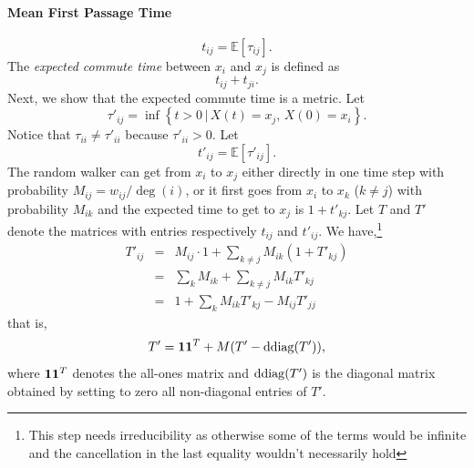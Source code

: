 \paragraph*{Mean First Passage Time}
\begin{equation}
t_{ij}=\mathbb{E}[\tau_{ij}].
\end{equation}
The {\em expected commute time} between ${x}_{i}$ and ${x}_{j}$
is defined as
\begin{equation}
t_{ij}+t_{ji}.
\end{equation}
Next, we show that the expected commute
time is a metric. Let
\begin{equation}
\tau'_{ij}=\inf\left\{ t>0 \,|\, X(t)={x}_{j},\,X(0)={x}_{i}\right\}.
\end{equation}
Notice that $\tau_{ii} \neq \tau'_{ii}$ because $\tau'_{ii} > 0.$ Let
\begin{equation}
t'_{ij}=\mathbb{E}[\tau'_{ij}].
\end{equation}
The random walker can get from $x_i$ to $x_j$ either directly in one time step with probability $M_{ij}=w_{ij}/\deg(i)$, or it first goes from $x_i$ to $x_k$ ($k\neq j$) with probability $M_{ik}$ and the expected time to get to $x_j$ is $1+t'_{kj}$. Let $T$ and $T'$ denote the matrices with entries respectively  $t_{ij}$ and $t'_{ij}$. We have,\footnote{This step needs irreducibility as otherwise some of the terms would be infinite and the cancellation in the last equality wouldn't necessarily hold}
\begin{eqnarray}
T'_{ij}&=&M_{ij}\cdot1+\sum_{k\neq j}M_{ik}(1+T'_{kj}) \nonumber \\
&=& \sum_{k}M_{ik} + \sum_{k\neq j} M_{ik}T'_{kj} \nonumber \\
&=& 1 + \sum_{k} M_{ik}T'_{kj} - M_{ij}T'_{jj}
\end{eqnarray}
that is,
\begin{equation}
T'=\mathbf{1}\mathbf{1}^T+M(T'-\mathrm{ddiag}(T')),\label{eq:cmt1}
\end{equation}
 where $\mathbf{1}\mathbf{1}^T$ denotes the all-ones matrix and $\mathrm{ddiag}(T')$ is the diagonal matrix obtained by setting to zero all non-diagonal entries of $T'$. 
 


